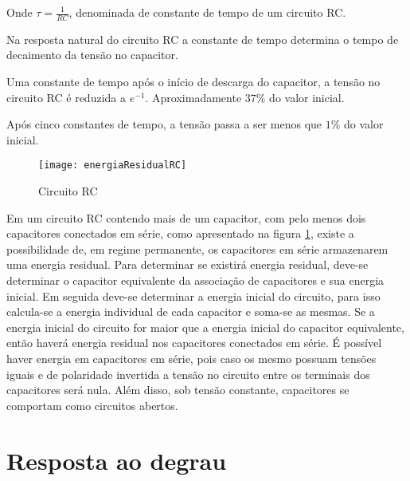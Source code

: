 \documentclass[12pt,fleqn]{book} %
\begin{document}
{Onde $\tau = \frac{1}{RC}$, denominada de constante de tempo de um circuito RC.

\begin{remark}
Na resposta natural do circuito RC a constante de tempo determina o tempo de decaimento da tensão no capacitor.
\end{remark}

\begin{remark}
Uma constante de tempo após o início de descarga do capacitor, a tensão no circuito RC é reduzida a $e^{-1}$. Aproximadamente $37\%$ do valor inicial.
\end{remark}

\begin{remark}
Após cinco constantes de tempo, a tensão passa a ser menos que $1\%$ do valor inicial.
\end{remark}

        \begin{figure}[!htbp] \centering\texttt{[image: energiaResidualRC]}
            \caption{Circuito RC}\label{energiaResidualRC} 
        \end{figure}

\begin{remark}
Em um circuito RC contendo mais de um capacitor, com pelo menos dois capacitores conectados em série, como apresentado na figura \ref{energiaResidualRC}, existe a possibilidade de, em regime permanente, os capacitores em série armazenarem uma energia residual. Para determinar se existirá energia residual, deve-se determinar o capacitor equivalente da associação de capacitores e sua energia inicial. Em seguida deve-se determinar a energia inicial do circuito, para isso calcula-se a energia individual de cada capacitor e soma-se as mesmas. Se a energia inicial do circuito for maior que a energia inicial do capacitor equivalente, então haverá energia residual nos capacitores conectados em série. É possível haver energia em capacitores em série, pois caso os mesmo possuam tensões iguais e de polaridade invertida a tensão no circuito entre os terminais dos capacitores será nula. Além disso, sob tensão constante, capacitores se comportam como circuitos abertos.
\end{remark}
        
        
    
    \section{Resposta ao degrau}
    
}
\end{document}
